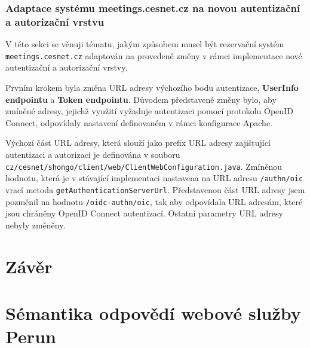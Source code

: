 \documentclass[
  printed, %
  twoside, %
  table,   %
  nolof,     %
  nolot,     %
]{fithesis3}
\begin{document}
\subsection{Adaptace systému meetings.cesnet.cz na novou autentizační a autorizační vrstvu}
\label{ShongoImpl-web}
V této sekci se věnuji tématu, jakým způsobem musel být rezervační systém \texttt{meetings.cesnet.cz} adaptován na provedené změny v rámci implementace nové autentizační a autorizační vrstvy. 
\par

Prvním krokem byla změna URL adresy výchozího bodu autentizace, \textbf{UserInfo endpointu} a \textbf{Token endpointu}. Důvodem představené změny bylo, aby zmíněné adresy, jejichž využití vyžaduje autentizaci pomocí protokolu OpenID Connect, odpovídaly nastavení definovaném v rámci konfigurace Apache. \par


Výchozí část URL adresy, která slouží jako prefix URL adresy zajištující autentizaci a autorizaci je definována v souboru \texttt{cz/cesnet/shongo/client/web/ClientWebConfiguration.java}. Zmíněnou hodnotu, která je v stávající implementaci nastavena na URL adresu \texttt{/authn/oic} vrací metoda \texttt{getAuthenticationServerUrl}. Představenou část URL adresy jsem pozměnil na hodnotu \texttt{/oidc-authn/oic}, tak aby odpovídala URL adresám, které jsou chráněny OpenID Connect autentizací. Ostatní parametry URL adresy nebyly změněny. \par


\chapter{Závěr}
\printbibliography[title={Literatura}]

\appendix %
\chapter{Sémantika odpovědí webové služby Perun}
\end{document}
